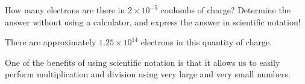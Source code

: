 

How many electrons are there in $2 \times 10^{-5}$ coulombs of charge?  Determine the answer without using a calculator, and express the answer in scientific notation!







There are approximately $1.25 \times 10^{14}$ electrons in this quantity of charge.







One of the benefits of using scientific notation is that it allows us to easily perform multiplication and division using very large and very small numbers.





